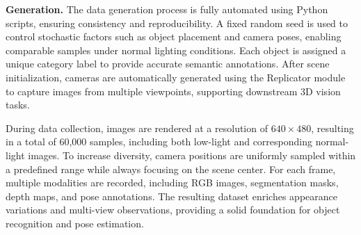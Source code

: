 \documentclass[letterpaper, 10 pt, journal, twoside]{IEEEtran}  %
\begin{document}
\textbf{Generation.} 
The data generation process is fully automated using Python scripts, ensuring consistency and reproducibility. 
A fixed random seed is used to control stochastic factors such as object placement and camera poses, enabling comparable samples under normal lighting conditions. 
Each object is assigned a unique category label to provide accurate semantic annotations. 
After scene initialization, cameras are automatically generated using the Replicator module to capture images from multiple viewpoints, supporting downstream 3D vision tasks.

During data collection, images are rendered at a resolution of $640 \times 480$, resulting in a total of 60,000 samples, including both low-light and corresponding normal-light images. 
To increase diversity, camera positions are uniformly sampled within a predefined range while always focusing on the scene center. 
For each frame, multiple modalities are recorded, including RGB images, segmentation masks, depth maps, and pose annotations. 
The resulting dataset enriches appearance variations and multi-view observations, providing a solid foundation for object recognition and pose estimation.
\end{document}
